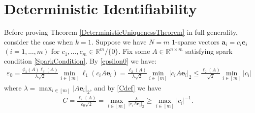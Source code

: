 \documentclass[journal, onecolumn]{IEEEtran}
\begin{document}
 

\section{Deterministic Identifiability}\label{DUT}


Before proving Theorem \ref{DeterministicUniquenessTheorem} in full generality, consider the case when $k=1$. Suppose we have $N = m$ $1$-sparse vectors $\mathbf{a}_i = c_i\mathbf{e}_i$ $(i = 1, \ldots, m)$ for $c_1, \ldots, c_m \in \mathbb{R}^m/\{0\}$. Fix some $A \in \mathbb{R}^{n \times m}$ satisfying spark condition \eqref{SparkCondition}. By \eqref{epsilon0} we have:
\begin{align}
\varepsilon_0 
= \frac{ \phi_1(A) \ell_{2}(A) }{\lambda \sqrt{2}} \min_{i \in [m]} \ell_1(c_iA\mathbf{e}_i) 
= \frac{\ell_2(A)}{\lambda \sqrt{2}} \min_{i \in [m]}|c_iA\mathbf{e}_i|_2
\leq \frac{\ell_2(A)}{ \sqrt{2}} \min_{i \in [m]}|c_i| 
\end{align}
%
where $\lambda = \max_{i \in [m]} |A\mathbf{e}_i|_2$, and by \eqref{Cdef} we have
\begin{align}
C = \frac{\ell_{2}(A)}{ \varepsilon_0 \sqrt{2}} = \max_{i \in [m]} \frac{\lambda}{|c_iA\mathbf{e}_i|_2} 
\geq \max_{i \in [m]} |c_i|^{-1}.
\end{align} 
\end{document}
